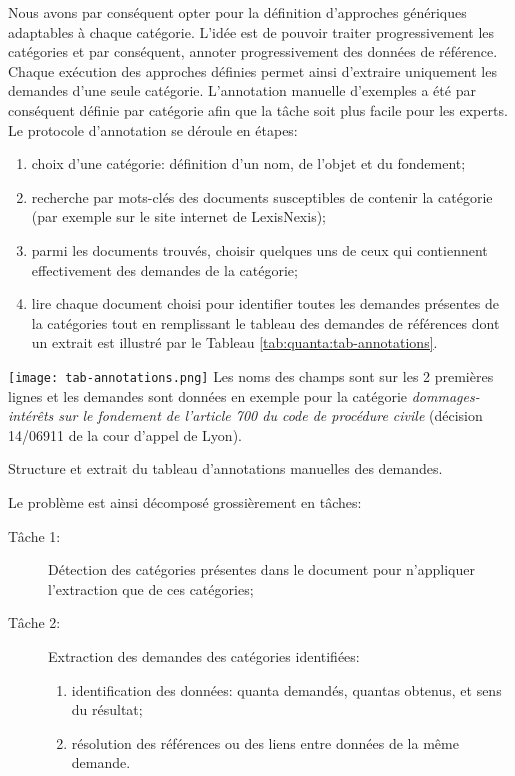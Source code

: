 Nous avons par conséquent opter pour la définition d'approches génériques adaptables à chaque catégorie. L'idée est de pouvoir  traiter progressivement les catégories et par conséquent, annoter progressivement des données de référence. Chaque exécution des approches définies permet ainsi d'extraire uniquement les demandes d'une seule catégorie. L'annotation manuelle d'exemples a été par conséquent définie par catégorie afin que la tâche soit plus facile pour les experts. Le protocole d'annotation se déroule en étapes: 
\begin{enumerate}
    \item choix d'une catégorie: définition d'un nom, de l'objet et du fondement;
    \item recherche par mots-clés des documents susceptibles de contenir la catégorie (par exemple sur le site internet de LexisNexis);
    \item parmi les documents trouvés, choisir quelques uns de ceux qui contiennent effectivement des demandes de la catégorie; 
    \item lire chaque document choisi pour identifier toutes les demandes présentes de la catégories tout en remplissant le tableau des demandes de références dont un extrait est illustré par le Tableau \ref{tab:quanta:tab-annotations}.
\end{enumerate}

\begin{table}[!htb]
\texttt{[image: tab-annotations.png]}
\scriptsize{Les noms des champs sont sur les 2 premières lignes et les demandes sont données en exemple pour la catégorie \textit{dommages-intérêts sur le fondement de l'article 700 du code de procédure civile} (décision 14/06911 de la cour d'appel de Lyon).}
\caption{Structure et extrait du tableau d'annotations manuelles des demandes.} \label{tab:quanta:tab-annotations}
\end{table}

Le problème est ainsi décomposé grossièrement en tâches:
\begin{description}
\item[Tâche 1:] Détection des catégories présentes dans le document pour n'appliquer l'extraction  que de ces catégories;
\item[Tâche 2:] Extraction des demandes des catégories identifiées:
\begin{enumerate}
	\item identification des données: quanta demandés, quantas obtenus, et sens du résultat;
	\item résolution des références ou des liens entre données de la même demande.
\end{enumerate}
\end{description}

